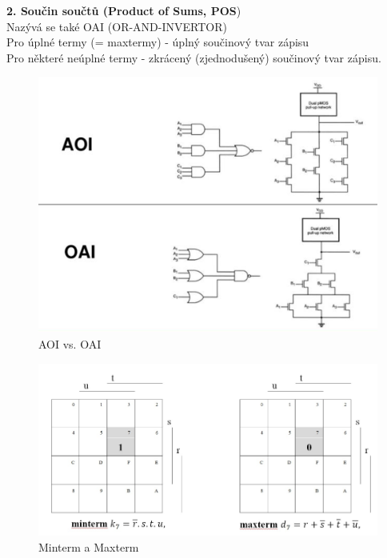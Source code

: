 \textbf{2. Součin součtů (Product of Sums, POS})\\
Nazývá se také OAI (OR-AND-INVERTOR)\\
Pro úplné termy (= maxtermy) - úplný součinový tvar zápisu\\
Pro některé neúplné termy - zkrácený (zjednodušený) součinový tvar zápisu.\\

   \begin{figure}[h]
   \begin{center}
     \includegraphics[scale=0.3]{images/AOI.png}
   \end{center}
   \caption{AOI vs. OAI}
  \end{figure}
  
   \begin{figure}[h]
   \begin{center}
     \includegraphics[scale=0.6]{images/minterm.png}
   \end{center}
   \caption{Minterm a Maxterm}
  \end{figure}  

